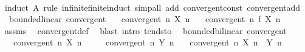\begin{isabellebody}
%
\isadelimproof
\ \ %
\endisadelimproof
%
\isatagproof
{}\isamarkupfalse%
\ {\isacharparenleft}{\kern0pt}induct\ A\ rule{\isacharcolon}{\kern0pt}\ infinite{\isacharunderscore}{\kern0pt}finite{\isacharunderscore}{\kern0pt}induct{\isacharparenright}{\kern0pt}\ {\isacharparenleft}{\kern0pt}simp{\isacharunderscore}{\kern0pt}all\ add{\isacharcolon}{\kern0pt}\ convergent{\isacharunderscore}{\kern0pt}const\ convergent{\isacharunderscore}{\kern0pt}add{\isacharparenright}{\kern0pt}%
\endisatagproof
{\isafoldproof}%
%
\isadelimproof
\isanewline
%
\endisadelimproof
\isanewline
{}\isamarkupfalse%
\ {\isacharparenleft}{\kern0pt}\ bounded{\isacharunderscore}{\kern0pt}linear{\isacharparenright}{\kern0pt}\ convergent{\isacharcolon}{\kern0pt}\isanewline
\ \ \ {\isachardoublequoteopen}convergent\ {\isacharparenleft}{\kern0pt}{\isasymlambda}n{\isachardot}{\kern0pt}\ X\ n{\isacharparenright}{\kern0pt}{\isachardoublequoteclose}\isanewline
\ \ \ {\isachardoublequoteopen}convergent\ {\isacharparenleft}{\kern0pt}{\isasymlambda}n{\isachardot}{\kern0pt}\ f\ {\isacharparenleft}{\kern0pt}X\ n{\isacharparenright}{\kern0pt}{\isacharparenright}{\kern0pt}{\isachardoublequoteclose}\isanewline
%
\isadelimproof
\ \ %
\endisadelimproof
%
\isatagproof
{}\isamarkupfalse%
\ assms\ \isamarkupfalse%
\ convergent{\isacharunderscore}{\kern0pt}def\ \isamarkupfalse%
\ {\isacharparenleft}{\kern0pt}blast\ intro{\isacharcolon}{\kern0pt}\ tendsto{\isacharparenright}{\kern0pt}%
\endisatagproof
{\isafoldproof}%
%
\isadelimproof
\isanewline
%
\endisadelimproof
\isanewline
{}\isamarkupfalse%
\ {\isacharparenleft}{\kern0pt}\ bounded{\isacharunderscore}{\kern0pt}bilinear{\isacharparenright}{\kern0pt}\ convergent{\isacharcolon}{\kern0pt}\isanewline
\ \ \ {\isachardoublequoteopen}convergent\ {\isacharparenleft}{\kern0pt}{\isasymlambda}n{\isachardot}{\kern0pt}\ X\ n{\isacharparenright}{\kern0pt}{\isachardoublequoteclose}\isanewline
\ \ \ \ \ {\isachardoublequoteopen}convergent\ {\isacharparenleft}{\kern0pt}{\isasymlambda}n{\isachardot}{\kern0pt}\ Y\ n{\isacharparenright}{\kern0pt}{\isachardoublequoteclose}\isanewline
\ \ \ {\isachardoublequoteopen}convergent\ {\isacharparenleft}{\kern0pt}{\isasymlambda}n{\isachardot}{\kern0pt}\ X\ n\ {\isacharasterisk}{\kern0pt}{\isacharasterisk}{\kern0pt}\ Y\ n{\isacharparenright}{\kern0pt}{\isachardoublequoteclose}\isanewline
%
\isadelimproof
\ \ %
\endisadelimproof

\end{isabellebody}
